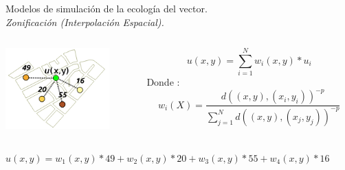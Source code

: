 \begin{frame}[t]{Modelos de simulación de la ecología del vector.\\\textit{Zonificación (Interpolación Espacial).}}
  \begin{center}
   \begin{columns}[T]
        \begin{column}[T]{3.5cm}
            \includegraphics[width=4cm]{./graphics/interpolacion-ej.png}
        \end{column}
        \begin{column}[T]{7cm}
        \begin{equation}\label{eq:interpolacion-idw}
         u(x,y) = \sum_{i=1}^{N} w_i(x,y) * u_{i}
        \end{equation}
        Donde :
        \begin{equation}
        w_i(X) =  \dfrac{d((x,y), (x_i,y_i))^{-p}}{\sum_{j=1}^{N} d((x,y), (x_j,y_j))^{-p}}
        \end{equation}
        \end{column}
    \end{columns}
  \end{center}
    $u(x,y) = w_1(x,y) * 49 + w_2(x,y) * 20 + w_3(x,y) * 55 + w_4(x,y) * 16 $
\end{frame}


